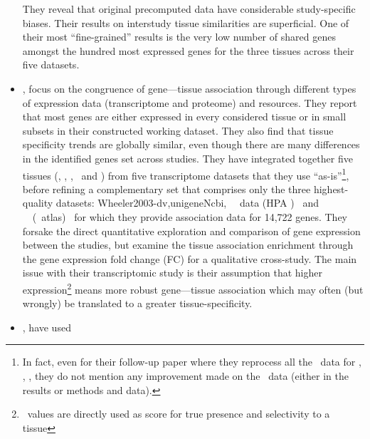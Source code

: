 \begin{itemize}[topsep=0pt,nosep]
They reveal that original precomputed data have considerable study-specific biases.
Their results on interstudy tissue similarities are superficial.
One of their most \enquote{fine-grained} results is the very low number of shared
genes amongst the hundred most expressed genes
for the three tissues across their five datasets.\mybr\
\item\hspace{-1mm}, focus on the congruence of gene---tissue association
through different types of expression data (transcriptome and proteome)
and resources.
They report that most genes are either expressed in every
considered tissue or in small subsets in their constructed working dataset.
They also find that tissue specificity trends are globally similar,
even though there are many differences in the identified genes set across studies.
They have integrated together five tissues
(\heart, \kidney, \liver, \nervous\ and \intestine)
from five transcriptome datasets that they use \enquote{as-is}\footnote{%
In fact, even for their follow-up paper \mycite{Palasca2018-fh}
where they reprocess all the \Rnaseq\ data
for , , ,
they do not mention any improvement made on the  \Rnaseq\
data (either in the results or methods and data).},
before refining a complementary set that comprises only the three highest-quality
datasets: %
{Wheeler2003-dv,unigeneNcbi}, \uhlen\ \etal\ data (HPA \Rnaseq)~
and \castle\ \etal\ (\Rnaseq\ atlas)~\mycite{Krupp2012} for which they provide
association data for 14,722 genes.
They forsake the direct quantitative exploration and comparison of gene expression
between the studies,
but examine the tissue association enrichment
through the gene expression fold change (FC) for a qualitative cross-study.
The main issue with their transcriptomic study is their
assumption that higher expression\footnote{\FPKM\ values are directly
used as score for true presence and selectivity to a tissue} means
more robust gene---tissue association
which may often (but wrongly) be translated to a greater tissue-specificity.\mybr\
\item\hspace{-1mm}, have used

\end{itemize}
